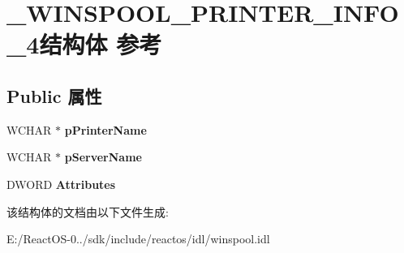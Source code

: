 \hypertarget{struct___w_i_n_s_p_o_o_l___p_r_i_n_t_e_r___i_n_f_o__4}{}\section{\+\_\+\+W\+I\+N\+S\+P\+O\+O\+L\+\_\+\+P\+R\+I\+N\+T\+E\+R\+\_\+\+I\+N\+F\+O\+\_\+4结构体 参考}
\label{struct___w_i_n_s_p_o_o_l___p_r_i_n_t_e_r___i_n_f_o__4}
\subsection*{Public 属性}
\begin{DoxyCompactItemize}
\item 
\mbox{\label{struct___w_i_n_s_p_o_o_l___p_r_i_n_t_e_r___i_n_f_o__4_a6845122d1e831c1aefe30477e92086fd}} 
W\+C\+H\+AR $\ast$ {\bfseries p\+Printer\+Name}
\item 
\mbox{\label{struct___w_i_n_s_p_o_o_l___p_r_i_n_t_e_r___i_n_f_o__4_a9e06a8819001cf7376b9c36379c38627}} 
W\+C\+H\+AR $\ast$ {\bfseries p\+Server\+Name}
\item 
\mbox{\label{struct___w_i_n_s_p_o_o_l___p_r_i_n_t_e_r___i_n_f_o__4_a3db4efb0c70d254fc099f47297c8470f}} 
D\+W\+O\+RD {\bfseries Attributes}
\end{DoxyCompactItemize}


该结构体的文档由以下文件生成\+:\begin{DoxyCompactItemize}
\item 
E\+:/\+React\+O\+S-\/0../sdk/include/reactos/idl/winspool.\+idl\end{DoxyCompactItemize}
